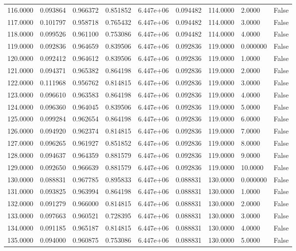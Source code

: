 \documentclass[11pt]{report}
\begin{document}
\begin{longtable}{lllllllll}
116.0000 & 0.093864 & 0.966372 & 0.851852 & 6.447e+06 & 0.094482 & 114.0000 & 2.0000 & False \\
117.0000 & 0.101797 & 0.958718 & 0.765432 & 6.447e+06 & 0.094482 & 114.0000 & 3.0000 & False \\
118.0000 & 0.099526 & 0.961100 & 0.753086 & 6.447e+06 & 0.094482 & 114.0000 & 4.0000 & False \\
119.0000 & 0.092836 & 0.964659 & 0.839506 & 6.447e+06 & 0.092836 & 119.0000 & 0.000000 & False \\
120.0000 & 0.092412 & 0.964612 & 0.839506 & 6.447e+06 & 0.092836 & 119.0000 & 1.0000 & False \\
121.0000 & 0.094371 & 0.965382 & 0.864198 & 6.447e+06 & 0.092836 & 119.0000 & 2.0000 & False \\
122.0000 & 0.111968 & 0.956762 & 0.814815 & 6.447e+06 & 0.092836 & 119.0000 & 3.0000 & False \\
123.0000 & 0.096610 & 0.963583 & 0.864198 & 6.447e+06 & 0.092836 & 119.0000 & 4.0000 & False \\
124.0000 & 0.096360 & 0.964045 & 0.839506 & 6.447e+06 & 0.092836 & 119.0000 & 5.0000 & False \\
125.0000 & 0.099284 & 0.962654 & 0.864198 & 6.447e+06 & 0.092836 & 119.0000 & 6.0000 & False \\
126.0000 & 0.094920 & 0.962374 & 0.814815 & 6.447e+06 & 0.092836 & 119.0000 & 7.0000 & False \\
127.0000 & 0.096265 & 0.961927 & 0.851852 & 6.447e+06 & 0.092836 & 119.0000 & 8.0000 & False \\
128.0000 & 0.094637 & 0.964359 & 0.881579 & 6.447e+06 & 0.092836 & 119.0000 & 9.0000 & False \\
129.0000 & 0.092650 & 0.966639 & 0.881579 & 6.447e+06 & 0.092836 & 119.0000 & 10.0000 & False \\
130.0000 & 0.088831 & 0.967785 & 0.895833 & 6.447e+06 & 0.088831 & 130.0000 & 0.000000 & False \\
131.0000 & 0.093825 & 0.963994 & 0.864198 & 6.447e+06 & 0.088831 & 130.0000 & 1.0000 & False \\
132.0000 & 0.091279 & 0.966000 & 0.814815 & 6.447e+06 & 0.088831 & 130.0000 & 2.0000 & False \\
133.0000 & 0.097663 & 0.960521 & 0.728395 & 6.447e+06 & 0.088831 & 130.0000 & 3.0000 & False \\
134.0000 & 0.091185 & 0.965187 & 0.814815 & 6.447e+06 & 0.088831 & 130.0000 & 4.0000 & False \\
135.0000 & 0.094000 & 0.960875 & 0.753086 & 6.447e+06 & 0.088831 & 130.0000 & 5.0000 & False \\

\end{longtable}
\end{document}

